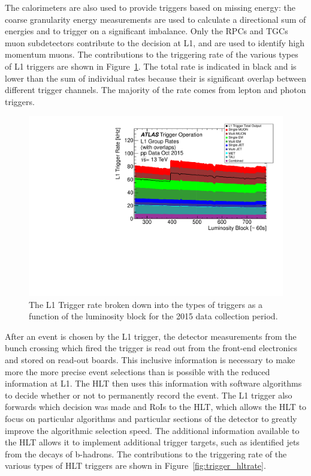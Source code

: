 The calorimeters are also used to provide triggers based on missing energy: the coarse granularity energy measurements are used to calculate a directional sum of energies and to trigger on a significant imbalance.
Only the \acp{RPC} and \acp{TGC} muon subdetectors contribute to the decision at L1, and are used to identify high momentum muons.
The contributions to the triggering rate of the various types of L1 triggers are shown in Figure~\ref{fig:trigger_l1rate}. 
The total rate is indicated in black and is lower than the sum of individual rates because their is significant overlap between different trigger channels. 
The majority of the rate comes from lepton and photon triggers.

\begin{figure}[hbtp]
\includegraphics[width=\fullfig]{figures/trigger_l1rate.pdf}
\caption{The L1 Trigger rate broken down into the types of triggers as a function of the luminosity block for the 2015 data collection period.}
\label{fig:trigger_l1rate}
\end{figure}

After an event is chosen by the L1 trigger, the detector measurements from the bunch crossing which fired the trigger is read out from the front-end electronics and stored on read-out boards.
This inclusive information is necessary to make more the more precise event selections than is possible with the reduced information at L1.
The \ac{HLT} then uses this information with software algorithms to decide whether or not to permanently record the event.
The L1 trigger also forwards which decision was made and \acp{RoI} to the \ac{HLT}, which allows the \ac{HLT} to focus on particular algorithms and particular sections of the detector to greatly improve the algorithmic selection speed.
The additional information available to the \ac{HLT} allows it to implement additional trigger targets, such as identified jets from the decays of b-hadrons.
The contributions to the triggering rate of the various types of \ac{HLT} triggers are shown in Figure~\ref{fig:trigger_hltrate}. 


